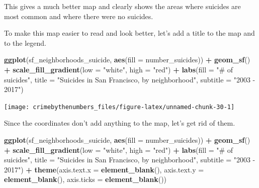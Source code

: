\documentclass[
  12pt,
]{book}
\newenvironment{Shaded}{\begin{snugshade}}{\end{snugshade}}
\newcommand{\DataTypeTok}[1]{\textcolor[rgb]{0.27,0.27,0.27}{#1}}
\newcommand{\KeywordTok}[1]{\textcolor[rgb]{0.27,0.27,0.27}{\textbf{#1}}}
\newcommand{\NormalTok}[1]{#1}
\newcommand{\OperatorTok}[1]{\textcolor[rgb]{0.43,0.43,0.43}{\textbf{#1}}}
\newcommand{\StringTok}[1]{\textcolor[rgb]{0.5,0.5,0.5}{#1}}
\begin{document}
This gives a much better map and clearly shows the areas where suicides are most common and where there were no suicides.

To make this map easier to read and look better, let's add a title to the map and to the legend.

\begin{Shaded}
\begin{Highlighting}[]
\KeywordTok{ggplot}\NormalTok{(sf\_neighborhoods\_suicide, }\KeywordTok{aes}\NormalTok{(}\DataTypeTok{fill =}\NormalTok{ number\_suicides)) }\OperatorTok{+}
\StringTok{  }\KeywordTok{geom\_sf}\NormalTok{() }\OperatorTok{+}
\StringTok{  }\KeywordTok{scale\_fill\_gradient}\NormalTok{(}\DataTypeTok{low =} \StringTok{"white"}\NormalTok{, }\DataTypeTok{high =} \StringTok{"red"}\NormalTok{) }\OperatorTok{+}
\StringTok{  }\KeywordTok{labs}\NormalTok{(}\DataTypeTok{fill =} \StringTok{"\# of suicides"}\NormalTok{,}
       \DataTypeTok{title =} \StringTok{"Suicides in San Francisco, by neighborhood"}\NormalTok{,}
       \DataTypeTok{subtitle =} \StringTok{"2003 {-} 2017"}\NormalTok{) }
\end{Highlighting}
\end{Shaded}

\begin{center}\texttt{[image: crimebythenumbers\_files/figure-latex/unnamed-chunk-30-1]} \end{center}

Since the coordinates don't add anything to the map, let's get rid of them.

\begin{Shaded}
\begin{Highlighting}[]
\KeywordTok{ggplot}\NormalTok{(sf\_neighborhoods\_suicide, }\KeywordTok{aes}\NormalTok{(}\DataTypeTok{fill =}\NormalTok{ number\_suicides)) }\OperatorTok{+}
\StringTok{  }\KeywordTok{geom\_sf}\NormalTok{() }\OperatorTok{+}
\StringTok{  }\KeywordTok{scale\_fill\_gradient}\NormalTok{(}\DataTypeTok{low =} \StringTok{"white"}\NormalTok{, }\DataTypeTok{high =} \StringTok{"red"}\NormalTok{) }\OperatorTok{+}
\StringTok{  }\KeywordTok{labs}\NormalTok{(}\DataTypeTok{fill =} \StringTok{"\# of suicides"}\NormalTok{,}
       \DataTypeTok{title =} \StringTok{"Suicides in San Francisco, by neighborhood"}\NormalTok{,}
       \DataTypeTok{subtitle =} \StringTok{"2003 {-} 2017"}\NormalTok{) }\OperatorTok{+}
\StringTok{  }\KeywordTok{theme}\NormalTok{(}\DataTypeTok{axis.text.x =} \KeywordTok{element\_blank}\NormalTok{(),}
        \DataTypeTok{axis.text.y =} \KeywordTok{element\_blank}\NormalTok{(),}
        \DataTypeTok{axis.ticks =} \KeywordTok{element\_blank}\NormalTok{())}
\end{Highlighting}
\end{Shaded}
\end{document}
